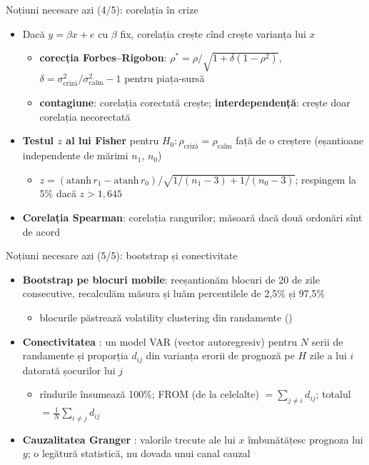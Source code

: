 \begin{frame}{Noțiuni necesare azi (4/5): corelația în crize}
\itemsize{\small}
\begin{itemize}
    \item Dacă $y = \beta x + e$ cu $\beta$ fix, corelația crește cînd crește varianța lui $x$ 
    \begin{itemize}
        \item \textbf{corecția Forbes--Rigobon}: $\rho^* = \rho/\sqrt{1 + \delta(1 - \rho^2)}$, $\delta = \sigma^2_{\text{criză}}/\sigma^2_{\text{calm}} - 1$ pentru piața-sursă
        \item \textbf{contagiune}: corelația corectată crește; \textbf{interdependență}: crește doar corelația necorectată
    \end{itemize}
    \item \textbf{Testul $z$ al lui Fisher} pentru $H_0: \rho_{\text{criză}} = \rho_{\text{calm}}$ față de o creștere (eșantioane independente de mărimi $n_1$, $n_0$)
    \begin{itemize}
        \item $z = (\mathrm{atanh}\,r_1 - \mathrm{atanh}\,r_0)/\sqrt{1/(n_1 - 3) + 1/(n_0 - 3)}$; respingem la 5\% dacă $z > 1{,}645$
    \end{itemize}
    \item \textbf{Corelația Spearman}: corelația rangurilor; măsoară dacă două ordonări sînt de acord
\end{itemize}
\end{frame}

\begin{frame}{Noțiuni necesare azi (5/5): bootstrap și conectivitate}
\itemsize{\small}
\begin{itemize}
    \item \textbf{Bootstrap pe blocuri mobile}: reeșantionăm blocuri de 20 de zile consecutive, recalculăm măsura și luăm percentilele de 2,5\% și 97,5\%
    \begin{itemize}
        \item blocurile păstrează volatility clustering din randamente ()
    \end{itemize}
    \item \textbf{Conectivitatea} : un model VAR (vector autoregresiv) pentru $N$ serii de randamente și proporția $d_{ij}$ din varianța erorii de prognoză pe $H$ zile a lui $i$ datorată șocurilor lui $j$
    \begin{itemize}
        \item rîndurile însumează 100\%; FROM (de la celelalte) $= \sum_{j \ne i} d_{ij}$; totalul $= \frac1N\sum_{i \ne j} d_{ij}$
    \end{itemize}
    \item \textbf{Cauzalitatea Granger} : valorile trecute ale lui $x$ îmbunătățesc prognoza lui $y$; o legătură statistică, nu dovada unui canal cauzal
\end{itemize}
\end{frame}


